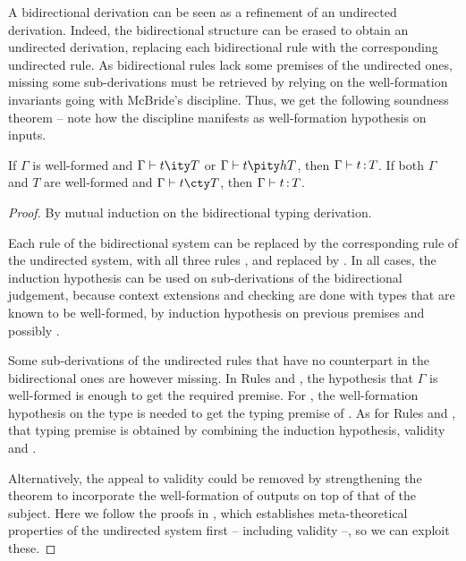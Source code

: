 A bidirectional derivation can be seen as a refinement of an undirected derivation.
Indeed, the bidirectional structure can be erased to obtain an undirected derivation, 
replacing each bidirectional rule with the corresponding undirected rule.
As bidirectional rules lack some premises of the undirected ones, missing some sub-derivations
must be retrieved by relying on the well-formation invariants going with McBride’s discipline.
Thus, we get the following soundness theorem – note how the
discipline manifests as well-formation hypothesis on inputs.

\begin{minipage}{\textwidth}
\begin{theorem}
  \label{thm:corr-ccomega}
  If $\Gamma$ is well-formed and $\inferty{\Gamma}{t}{T}$ or $\pinferty{h}{\Gamma}{t}{T}$,
  then $\Gamma \vdash t \operatorname{\mathrel{:}} T$.
  If both $\Gamma$ and $T$ are well-formed and
  $\checkty{\Gamma}{t}{T}$, then $\Gamma \vdash t \operatorname{\mathrel{:}} T$. 
\end{theorem}  
\end{minipage}

  
\begin{minipage}{\textwidth}
\begin{proof}
  By mutual induction on the bidirectional typing derivation.

  Each rule of the bidirectional system can be replaced by the corresponding rule of the
  undirected system, with all three rules ,  and  replaced by
  . In all cases, the induction hypothesis can be used on sub-derivations of the bidirectional judgement, because context extensions and checking are
  done with types that are known to be well-formed,%
  by induction hypothesis on previous premises and possibly .

  Some sub-derivations of the undirected rules that have no counterpart
  in the bidirectional ones are however missing.
  In Rules  and ,
  the hypothesis that $\Gamma$ is well-formed is enough to get the required premise.
  For ,
  the well-formation hypothesis on the type is needed to get the typing premise of
  .
  As for Rules  and ,
  that typing premise is obtained by combining the induction hypothesis,
  validity and .

  Alternatively, the appeal to validity could be removed by
  strengthening the theorem to incorporate the well-formation of outputs on top of that of
  the subject. Here we follow the proofs in , which establishes
  meta-theoretical properties of the undirected system first – including validity –,
  so we can exploit these.
\end{proof}
\end{minipage}

